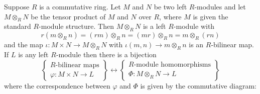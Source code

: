 \documentclass[12pt, a4paper, oneside, openright, titlepage]{book}
\begin{document}
\begin{cor}
    Suppose $R$ is a commutative ring. Let $M$ and $N$ be two left $R$-modules and let $M\otimes_RN$ be the tensor product of $M$ and $N$ over $R$, where $M$ is given the standard $R$-module structure. Then $M\otimes_RN$ is a left $R$-module with \begin{equation*}
        r(m\otimes_Rn) = (rm)\otimes_Rn = (mr)\otimes_Rn = m\otimes_R(rn)
    \end{equation*}
    and the map $\iota:M\times N\rightarrow M\otimes_RN$ with $\iota(m,n)\rightarrow m\otimes_Rn$ is an $R$-bilinear map. If $L$ is any left $R$-module then there is a bijection \begin{equation*}
        \left\{\begin{array}{c} R\text{-bilinear maps} \\ \varphi:M\times N\rightarrow L\end{array}\right\}\leftrightarrow \left\{\begin{array}{c} \text{$R$-module homomorphisms} \\ \Phi:M\otimes_R N\rightarrow L\end{array}\right\}
    \end{equation*}
    where the correspondence between $\varphi$ and $\Phi$ is given by the commutative diagram:
    \begin{center}
    \end{center}
\end{cor}
\end{document}
